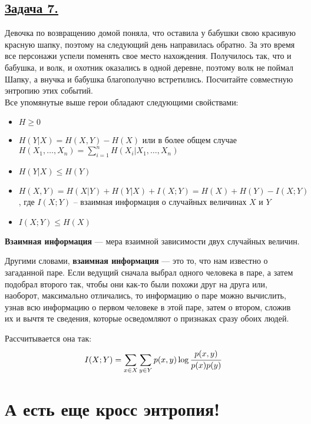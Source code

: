 \subsection*{\hyperref[sec:sol_problem7]{Задача 7.}}\label{sec:problem7} Девочка по возвращению домой поняла, что оставила у бабушки свою красивую красную шапку, поэтому на следующий день направилась обратно. За это время все персонажи успели поменять свое место нахождения. Получилось так, что и бабушка, и волк, и охотник оказались в одной деревне, поэтому волк не поймал Шапку, а внучка и бабушка благополучно встретились. Посчитайте совместную энтропию этих событий. \\

Все упомянутые выше герои обладают следующими свойствами:

\begin{itemize}
    \item $H \geqslant 0$
    \item $H(Y|X)=H(X, Y)-H(X)$ или в более общем случае $H(X_1, \ldots, X_n)=\sum\limits_{i=1}^n H(X_i|X_1, \ldots, X_n)$
    \item $H(Y|X)\leqslant H(Y)$
    \item $H(X, Y)=H(X|Y)+H(Y|X)+I(X; Y)=H(X)+H(Y)-I(X; Y)$, где $I(X; Y)$ -- взаимная информация о случайных величинах $X$ и $Y$
    \item $I(X; Y)\leqslant H(X)$
\end{itemize}

\begin{siderules}
    \textbf{Взаимная информация} --- мера взаимной зависимости двух случайных величин.
\end{siderules}

Другими словами, \textbf{взаимная информация} --- это то, что нам известно о загаданной паре. Если ведущий сначала выбрал одного человека в паре, а затем подобрал второго так, чтобы они как-то были похожи друг на друга или, наоборот, максимально отличались, то информацию о паре можно вычислить, узнав всю информацию о первом человеке в этой паре, затем о втором, сложив их и вычтя те сведения, которые осведомляют о признаках сразу обоих людей.

Рассчитывается она так:
\[I(X; Y)=\sum\limits_{x\in X}\sum\limits_{y\in Y} p(x, y)\log \cfrac{p(x, y)}{p(x)p(y)} \]

\section*{А есть еще кросс энтропия!}~\
\\

